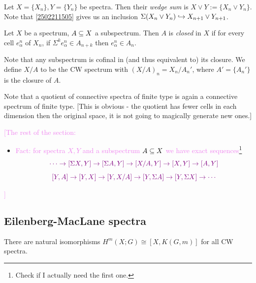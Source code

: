\documentclass{MetricNotes2023}
\def\subq{\ensuremath\subseteq}
\def\inj{\ensuremath\hookrightarrow}
\def\textcolour{\textcolor}
\begin{document}
\begin{definition}
Let \(X=\{X_n\}, Y=\{Y_n\}\) be spectra. Then their \textit{wedge sum} %
 is \(X\vee Y :=\{X_n \vee Y_n\}\). Note that \ref{2502211505} gives us an inclusion \(\Sigma(X_n\vee Y_n)\inj X_{n+1}\vee Y_{n+1}\). 
\end{definition}

\begin{definition}
Let \(X\) be a spectrum, \(A\subq X\) a subspectrum. Then \(A\) is \textit{closed} in \(X\) if for every cell \(e_\alpha^n\) of \(X_n\), if \(\Sigma^k e_\alpha^n \in A_{n+k}\) then \(e_\alpha^n \in A_n\). 
\end{definition}

Note that any subspectrum is cofinal in (and thus equivalent to) its closure. We define \(X/A\) to be the CW spectrum with \((X/A)_n=X_n/A_n'\), where \(A'=\{A_n'\}\) is the closure of \(A\). 

Note that a quotient of connective spectra of finite type is again a connective spectrum of finite type. [This is obvious - the quotient has fewer cells in each dimension then the original space, it is not going to magically generate new ones.]

\textcolour{violet}{[The rest of the section:}

\begin{itemize}
\item \textcolour{violet}{Fact: for spectra \(X, Y\) and a subspectrum \(A\subq X\) we have exact sequences\footnote{Check if I actually need the first one.}}
\[\textcolour{violet}{\cdots \to [\Sigma X, Y]\to [\Sigma A, Y]\to [X/A,Y]\to[X,Y]\to[A,Y]}\]
\[\textcolour{violet}{[Y,A]\to[Y,X]\to[Y,X/A]\to[Y,\Sigma A]\to[Y,\Sigma X]\to\cdots}\]
\end{itemize}

\textcolour{violet}{]}

\subsection{Eilenberg-MacLane spectra}

\begin{theorem}\label{2503221328}
There are natural isomorphisms \(H^m(X;G)\cong [X,K(G,m)]\) for all CW spectra.
\end{theorem}
\end{document}
